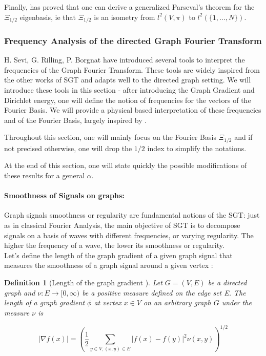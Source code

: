 \documentclass{article}
\newtheorem{definition}{Definition}[section]
\begin{document}
Finally, \cite{sevi2019} has proved that one can derive a generalized Parseval's theorem for the $\Xi_{1/2}$ eigenbasis, ie that $\Xi_{1/2}$ is an isometry from $l^2(V, \pi)$ to $l^2(\{1, \hdots, N \})$.

\subsubsection{Frequency Analysis of the directed Graph Fourier Transform}

H. Sevi, G. Rilling, P. Borgnat \cite{sevi2019} have introduced several tools to interpret the frequencies of the Graph Fourier Transform. These tools are widely inspired from the other works of SGT and adapts well to the directed graph setting. We will introduce these tools in this section - after introducing the Graph Gradient and Dirichlet energy, one will define the notion of frequencies for the vectors of the Fourier Basis. We will provide a physical based interpretation of these frequencies and of the Fourier Basis, largely inspired by \cite{sevi2019}.

Throughout this section, one will mainly focus on the Fourier Basis $\Xi_{1/2}$ and if not precised otherwise, one will drop the $1/2$ index to simplify the notations. 

At the end of this section, one will state quickly the possible modifications of these results for a general $\alpha$.

\paragraph{Smoothness of Signals on graphs:}
Graph signals smoothness or regularity are fundamental notions of the SGT: just as in classical Fourier Analysis, the main objective of SGT is to decompose signals on a basis of waves with different frequencies, or varying regularity. The higher the frequency of a wave, the lower its smoothness or regularity. \\
Let's define the length of the graph gradient of a given graph signal that measures the smoothness of a graph signal around a given vertex : 

\begin{definition}[Length of the graph gradient \cite{sevi2019, coulhon_grigoryan_1998}]
Let $G=(V,E)$ be a directed graph and $\nu : E \rightarrow [0, \infty)$ be a positive measure defined on the edge set E. The length of a graph gradient $\phi$ at vertex $x \in V$ on an arbitrary graph $G$ under the measure $\nu$ is

\begin{equation}
    | \nabla f(x) | = (\frac{1}{2} \underset{y \in V, (x,y) \in E}{\sum} |f(x)-f(y)|^2 \nu(x,y))^{1/2}
\end{equation}

\end{definition}
\end{document}
